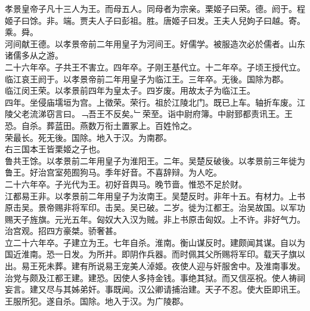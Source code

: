 \documentclass{zhvt-classic}
\begin{document}

\hspace*{2em}孝景皇帝子凡十三人为王。而母五人。同母者为宗亲。栗姬子曰荣。德。阏于。程姬子曰馀。非。端。贾夫人子曰彭祖。胜。唐姬子曰发。王夫人兒姁子曰越。寄。乘。舜。\\
\hspace*{2em}河间献王德。以孝景帝前二年用皇子为河间王。好儒学。被服造次必於儒者。山东诸儒多从之游。\\
\hspace*{2em}二十六年卒。子共王不害立。四年卒。子刚王基代立。十二年卒。子顷王授代立。\\
\hspace*{2em}临江哀王阏于。以孝景帝前二年用皇子为临江王。三年卒。无後。国除为郡。\\
\hspace*{2em}临江闵王荣。以孝景前四年为皇太子。四岁废。用故太子为临江王。\\
\hspace*{2em}四年。坐侵庙壖垣为宫。上徵荣。荣行。祖於江陵北门。既已上车。轴折车废。江陵父老流涕窃言曰。﹁吾王不反矣。﹂荣至。诣中尉府簿。中尉郅都责讯王。王恐。自杀。葬蓝田。燕数万衔土置冢上。百姓怜之。\\
\hspace*{2em}荣最长。死无後。国除。地入于汉。为南郡。\\
\hspace*{2em}右三国本王皆栗姬之子也。\\
\hspace*{2em}鲁共王馀。以孝景前二年用皇子为淮阳王。二年。吴楚反破後。以孝景前三年徙为鲁王。好治宫室苑囿狗马。季年好音。不喜辞辩。为人吃。\\
\hspace*{2em}二十六年卒。子光代为王。初好音舆马。晚节啬。惟恐不足於财。\\
\hspace*{2em}江都易王非。以孝景前二年用皇子为汝南王。吴楚反时。非年十五。有材力。上书原击吴。景帝赐非将军印。击吴。吴已破。二岁。徙为江都王。治吴故国。以军功赐天子旌旗。元光五年。匈奴大入汉为贼。非上书原击匈奴。上不许。非好气力。治宫观。招四方豪桀。骄奢甚。\\
\hspace*{2em}立二十六年卒。子建立为王。七年自杀。淮南。衡山谋反时。建颇闻其谋。自以为国近淮南。恐一日发。为所并。即阴作兵器。而时佩其父所赐将军印。载天子旗以出。易王死未葬。建有所说易王宠美人淖姬。夜使人迎与奸服舍中。及淮南事发。治党与颇及江都王建。建恐。因使人多持金钱。事绝其狱。而又信巫祝。使人祷祠妄言。建又尽与其姊弟奸。事既闻。汉公卿请捕治建。天子不忍。使大臣即讯王。王服所犯。遂自杀。国除。地入于汉。为广陵郡。\\
\end{document}
